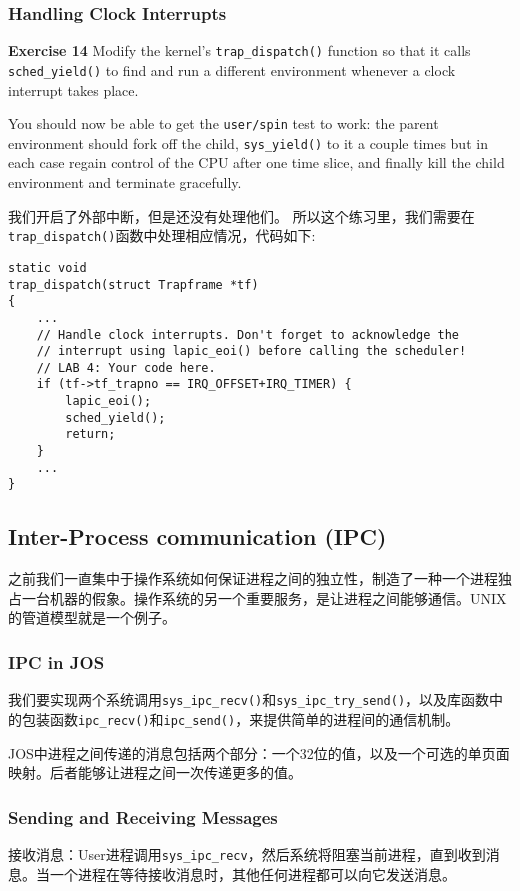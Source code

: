 \documentclass[11pt]{article}
\begin{document}
\subsubsection{Handling Clock Interrupts}
\begin{framed}
\noindent\textbf{Exercise 14} Modify the kernel's \lstinline|trap_dispatch()| function so that it calls \lstinline|sched_yield()| to find and run a different environment whenever a clock interrupt takes place.

You should now be able to get the \lstinline|user/spin| test to work: the parent environment should fork off the child, \lstinline|sys_yield()| to it a couple times but in each case regain control of the CPU after one time slice, and finally kill the child environment and terminate gracefully.
\end{framed}
我们开启了外部中断，但是还没有处理他们。 所以这个练习里，我们需要在\lstinline|trap_dispatch()|函数中处理相应情况，代码如下:
\begin{lstlisting}[title=kern/trap.c]
static void
trap_dispatch(struct Trapframe *tf)
{
	...
	// Handle clock interrupts. Don't forget to acknowledge the
	// interrupt using lapic_eoi() before calling the scheduler!
	// LAB 4: Your code here.
	if (tf->tf_trapno == IRQ_OFFSET+IRQ_TIMER) {
		lapic_eoi();
		sched_yield();
		return;
	}
	...
}
\end{lstlisting}

\subsection{Inter-Process communication (IPC)}
之前我们一直集中于操作系统如何保证进程之间的独立性，制造了一种一个进程独占一台机器的假象。操作系统的另一个重要服务，是让进程之间能够通信。UNIX的管道模型就是一个例子。

\subsubsection{IPC in JOS}
我们要实现两个系统调用\lstinline|sys_ipc_recv()|和\lstinline|sys_ipc_try_send()|，以及库函数中的包装函数\lstinline|ipc_recv()|和\lstinline|ipc_send()|，来提供简单的进程间的通信机制。

JOS中进程之间传递的消息包括两个部分：一个32位的值，以及一个可选的单页面映射。后者能够让进程之间一次传递更多的值。

\subsubsection{Sending and Receiving Messages}
接收消息：User进程调用\lstinline|sys_ipc_recv|，然后系统将阻塞当前进程，直到收到消息。当一个进程在等待接收消息时，其他任何进程都可以向它发送消息。
\end{document}
